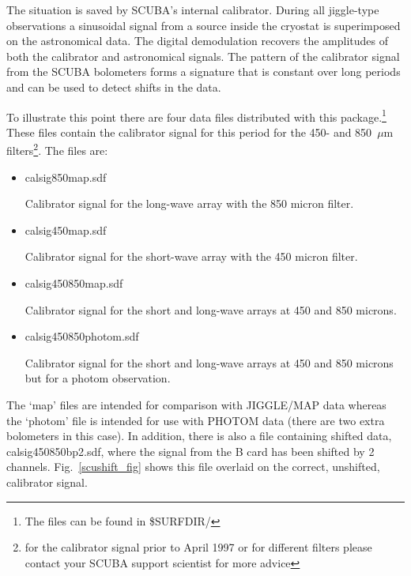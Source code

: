 \documentclass[twoside,11pt]{article}
\renewcommand{\_}{\texttt{\symbol{95}}}
\begin{document}
The situation is saved by SCUBA's internal calibrator. During all
jiggle-type observations a sinusoidal signal from a source inside the
cryostat is superimposed on the astronomical data. The digital
demodulation recovers the amplitudes of both the calibrator and
astronomical signals. The pattern of the calibrator signal from the SCUBA
bolometers forms a signature that is constant over long periods and can be
used to detect shifts in the data.

To illustrate this point there are four data files distributed with this
package.\footnote{The files can be found in \$SURF\_DIR/}         
These files contain the calibrator signal for this period for the
450- and 850~$\mu$m filters\footnote{for the calibrator signal prior to April
1997 or for different filters please contact your SCUBA support scientist for
more advice}. The files are:

\begin{itemize}
\item calsig\_850\_map.sdf

Calibrator signal for the long-wave array with the 850 micron filter.

\item calsig\_450\_map.sdf

Calibrator signal for the short-wave array with the 450 micron filter.

\item calsig\_450\_850\_map.sdf

Calibrator signal for the short and long-wave arrays at 450 and 850 microns.

\item calsig\_450\_850\_photom.sdf

Calibrator signal for the short and long-wave arrays at 450 and 850 microns
but for a photom observation.

\end{itemize}

The `\_map' files are intended for comparison with JIGGLE/MAP data whereas the
`\_photom' file is intended for use with PHOTOM data (there are two extra
bolometers in this case).  In addition, there is also a file containing
shifted data, calsig\_450\_850\_bp2.sdf, where the signal from the B card has
been shifted by 2 channels. Fig.\ \ref{scushift_fig} shows this file overlaid
on the correct, unshifted, calibrator signal.
 
\end{document}
